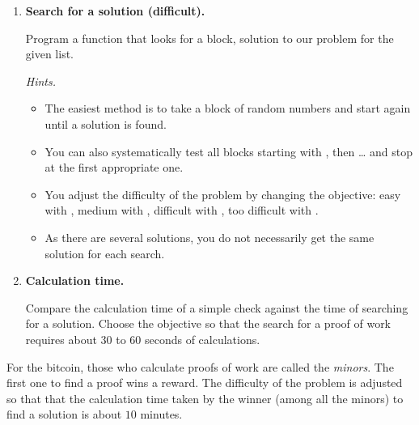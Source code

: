 \documentclass[11pt,class=report,crop=false]{standalone}
\begin{document}
\begin{activite}
\begin{enumerate}
  \item \textbf{Search for a solution (difficult).}
  
  Program a  function that looks for a  block, solution to our problem for the given list. 
  
  
  \emph{Hints.}
  
  \begin{itemize}
    \item The easiest method is to take a  block of random numbers and start again until a solution is found.
    
    \item You can also systematically test all blocks starting with \ci{[0,0,0,0,0,0]}, then \ci{[0,0,0,0,0,1]}\ldots{} and stop at the first appropriate one.
    
    \item You adjust the difficulty of the problem by changing the objective: easy with , medium with , difficult with , too difficult with .
    
    \item As there are several solutions, you do not necessarily get the same solution for each search. 
    
   \end{itemize}
   
   \item \textbf{Calculation time.}
   
   Compare the calculation time of a simple check against the time of searching for a solution. Choose the  objective so that the search for a proof of work requires about 30 to 60 seconds of calculations.
  
\end{enumerate}  

For the bitcoin, those who calculate proofs of work are called the \emph{minors}. The first one to find a proof wins a reward. The difficulty of the problem is adjusted so that 
that the calculation time taken by the winner (among all the minors) to find a solution is about $10$ minutes.

\end{activite}


\end{document}
